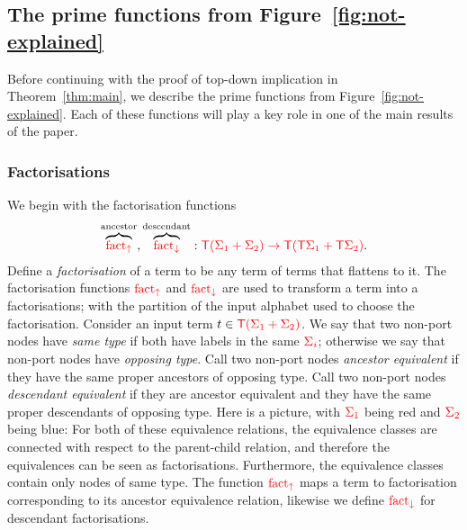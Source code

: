 %
\subsection{The prime functions from Figure~\ref{fig:not-explained}}
\label{sec:prime-and-combinators}
Before continuing with the proof of top-down implication in Theorem~\ref{thm:main}, we  describe the prime functions from Figure~\ref{fig:not-explained}. 
Each of these functions will play a key role in one of the main results of the paper.


\subsubsection{Factorisations}
We begin with the factorisation functions 
\begin{align*}
    \overbrace{{\color{red}{\mathrm{fact_{\uparrow}}}}}^{\text{ancestor}}, \overbrace{{\color{red}{\mathrm{fact_{\downarrow}}}}}^{\text{descendant}}  : {\color{red}{{\color{red}{\mathsf T}}(\Sigma_1+\Sigma_2) \to {\color{red}{\mathsf T}}({\color{red}{\mathsf T}}\Sigma_1 + {\color{red}{\mathsf T}}\Sigma_2)}}.
\end{align*}
Define a \emph{factorisation} of a term   to be any term of terms that flattens to it. 
The factorisation functions ${\color{red}{\mathrm{fact_{\uparrow}}}}$ and ${\color{red}{\mathrm{fact_{\downarrow}}}}$ are used to transform a term  into a factorisations; with the partition of the input alphabet used to choose the factorisation.  Consider an input term $t \in {\color{red}{{\color{red}{\mathsf T}}({\color{red}{\Sigma}}_1 + {\color{red}{\Sigma}}_2)}}$.
        We say that two non-port nodes have \emph{same type} if both have labels in the same  ${\color{red}{\Sigma_i}}$; otherwise we say that non-port nodes have \emph{opposing type}.  Call two non-port nodes \emph{ancestor equivalent}  if they have the same proper ancestors of opposing type. Call two non-port nodes \emph{descendant equivalent}  if they  are ancestor equivalent and they have the same proper descendants of opposing type. Here is a picture, with ${\color{red}{\Sigma_1}}$ being red and ${\color{red}{\Sigma_2}}$ being blue: 
        For both of these equivalence relations, the equivalence classes are connected with respect to the parent-child relation, and therefore the equivalences can be seen as factorisations. Furthermore, the equivalence classes contain only nodes of same type.  The function ${\color{red}{\mathrm{fact_{\uparrow}}}}$ maps a term to factorisation corresponding to its ancestor equivalence relation, likewise we define ${\color{red}{\mathrm{fact_{\downarrow}}}}$ for  descendant factorisations.
    
